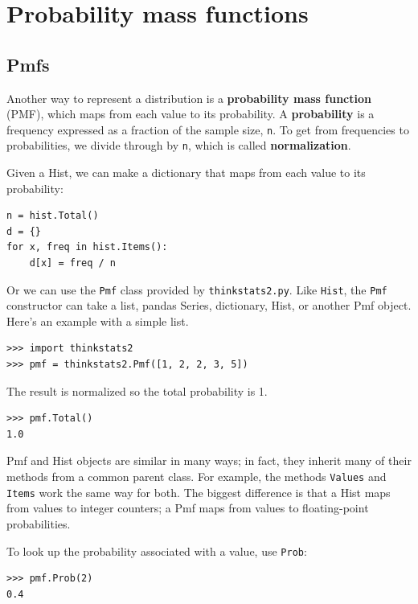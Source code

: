 \documentclass[12pt]{book}
\begin{document}
\chapter{Probability mass functions}

\section{Pmfs}

Another way to represent a distribution is a {\bf probability mass
  function} (PMF), which maps from each value to its probability.  A
{\bf probability} is a frequency expressed as a fraction of the sample
size, {\tt n}.  To get from frequencies to probabilities, we divide
through by {\tt n}, which is called {\bf normalization}.

Given a Hist, we can make a dictionary that maps from each
value to its probability:
%
\begin{verbatim}
n = hist.Total()
d = {}
for x, freq in hist.Items():
    d[x] = freq / n
\end{verbatim}
%
Or we can use the {\tt Pmf} class provided by {\tt thinkstats2.py}.
Like {\tt Hist}, the {\tt Pmf} constructor can take a list, pandas
Series, dictionary, Hist, or another Pmf object.  Here's an example
with a simple list.
%
\begin{verbatim}
>>> import thinkstats2
>>> pmf = thinkstats2.Pmf([1, 2, 2, 3, 5])
\end{verbatim}

The result is normalized so the total probability is 1.

\begin{verbatim}
>>> pmf.Total()
1.0
\end{verbatim}

Pmf and Hist objects are similar in many ways; in fact, they inherit
many of their methods from a common parent class.  For example, the
methods {\tt Values} and {\tt Items} work the same way for both.  The
biggest difference is that a Hist maps from values to integer
counters; a Pmf maps from values to floating-point probabilities.

To look up the probability associated with a value, use {\tt Prob}:
%
\begin{verbatim}
>>> pmf.Prob(2)
0.4
\end{verbatim}
\end{document}
